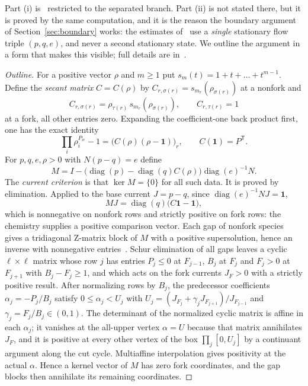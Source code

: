 \documentclass[11pt,a4paper]{article}
\theoremstyle{plain}
\theoremstyle{definition}
\theoremstyle{remark}
\numberwithin{equation}{section}
\newcommand{\one}{\mathbf{1}}
\newcommand{\diag}{\operatorname{diag}}
\newcommand{\Ker}{\operatorname{ker}}
\begin{document}
Part (i) is~\cite[Theorem~1.1]{TypeIIpos} restricted to the separated branch. Part (ii) is not stated there, but it is proved by the same computation, and it is the reason the boundary argument of Section~\ref{sec:boundary} works: the estimates of~\cite{TypeIIpos} use a \emph{single} stationary flow triple $(p,q,e)$, and never a second stationary state. We outline the argument in a form that makes this visible; full details are in~\cite[\S\S4--5]{TypeIIpos}.

\begin{proof}[Outline]
For a positive vector $\rho$ and $m\ge1$ put $s_m(t)=1+t+\dots+t^{m-1}$. Define the \emph{secant matrix} $C=C(\rho)$ by $C_{r,\sigma(r)}=s_{m_r}(\rho_{\sigma(r)})$ at a nonfork and
\[
C_{r,\sigma(r)}=\rho_{\tau(r)}\,s_{m_r}(\rho_{\sigma(r)}),\qquad C_{r,\tau(r)}=1
\]
at a fork, all other entries zero. Expanding the coefficient-one back product first, one has the exact identity
\begin{equation}\label{eq:secant}
\prod_i\rho_i^{P_{ir}}-1=\bigl(C(\rho)(\rho-\one)\bigr)_r,\qquad C(\one)=P^{\mathsf T}.
\end{equation}
For $p,q,e,\rho>0$ with $N(p-q)=e$ define
\begin{equation}\label{eq:currentmatrix}
M=I-\bigl(\diag(p)-\diag(q)C(\rho)\bigr)\diag(e)^{-1}N .
\end{equation}
The \emph{current criterion} is that $\Ker M=\{0\}$ for all such data. It is proved by elimination. Applied to the base current $J=p-q$, since $\diag(e)^{-1}NJ=\one$,
\begin{equation}\label{eq:MJ}
MJ=\diag(q)\bigl(C\one-\one\bigr),
\end{equation}
which is nonnegative on nonfork rows and strictly positive on fork rows: the chemistry supplies a positive comparison vector. Each gap of nonfork species gives a tridiagonal Z-matrix block of $M$ with a positive supersolution, hence an inverse with nonnegative entries~\cite{BP94}. Schur elimination of all gaps leaves a cyclic $\ell\times\ell$ matrix whose row $j$ has entries $P_j\le0$ at $F_{j-1}$, $B_j$ at $F_j$ and $F_j>0$ at $F_{j+1}$ with $B_j-F_j\ge1$, and which acts on the fork currents $J_{F}>0$ with a strictly positive result. After normalizing rows by $B_j$, the predecessor coefficients $\alpha_j=-P_j/B_j$ satisfy $0\le\alpha_j<U_j$ with $U_j=(J_{F_j}+\gamma_jJ_{F_{j+1}})/J_{F_{j-1}}$ and $\gamma_j=F_j/B_j\in(0,1)$. The determinant of the normalized cyclic matrix is affine in each $\alpha_j$; it vanishes at the all-upper vertex $\alpha=U$ because that matrix annihilates $J_F$, and it is positive at every other vertex of the box $\prod_j[0,U_j]$ by a continuant argument along the cut cycle. Multiaffine interpolation gives positivity at the actual $\alpha$. Hence a kernel vector of $M$ has zero fork coordinates, and the gap blocks then annihilate its remaining coordinates.


\end{proof}
\end{document}
